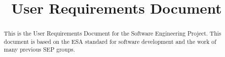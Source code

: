 

\title{User Requirements Document}

\newcommand{\TitelAbbr}{SQAP}
\newcommand{\Version}{0.0}



\maketitle

\begin{abstract}
This is the User Requirements Document for the Software Engineering Project. This document is based on the ESA standard for software development and the work of many previous SEP groups.
\end{abstract}

\tableofcontents 











